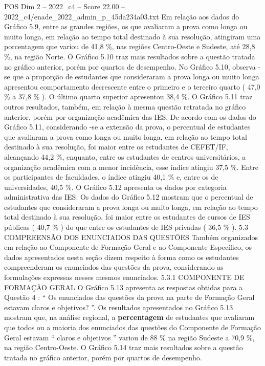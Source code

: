 \begin{textsample}{POS Dim 2 – 2022\_c4 – Score 22.00 – 2022\_c4/enade\_2022\_admin\_p\_45da234a03.txt}
Em relação aos dados do Gráfico 5.9, entre as grandes regiões, os que avaliaram a prova como longa ou muito longa, em relação ao tempo total destinado à sua resolução, atingiram uma porcentagem que variou de 41,8 \%, nas regiões Centro-Oeste e Sudeste, até 28,8 \%, na região Norte.
O Gráfico 5.10 traz mais resultados sobre a questão tratada no gráfico anterior, porém por quartos de desempenho.
No Gráfico 5.10, observa -se que a proporção de estudantes que consideraram a prova longa ou muito longa apresentou comportamento decrescente entre o primeiro e o terceiro quarto ( 47,0 \% a 37,8 \% ).
O último quarto superior apresentou 38,4 \%.
O Gráfico 5.11 traz outros resultados, também, em relação à mesma questão retratada no gráfico anterior, porém por organização acadêmica das IES.
De acordo com os dados do Gráfico 5.11, considerando -se a extensão da prova, o percentual de estudantes que avaliaram a prova como longa ou muito longa, em relação ao tempo total destinado à sua resolução, foi maior entre os estudantes de CEFET/IF, alcançando 44,2 \%, enquanto, entre os estudantes de centros universitários, a organização acadêmica com a menor incidência, esse índice atingiu 37,5 \%.
Entre os participantes de faculdades, o índice atingiu 40,1 \% e, entre os de universidades, 40,5 \%.
O Gráfico 5.12 apresenta os dados por categoria administrativa das IES.
Os dados do Gráfico 5.12 mostram que o percentual de estudantes que consideraram a prova longa ou muito longa, em relação ao tempo total destinado à sua resolução, foi maior entre os estudantes de cursos de IES públicas ( 40,7 \% ) do que entre os estudantes de IES privadas ( 36,5 \% ). 5.3 COMPREENSÃO DOS ENUNCIADOS DAS QUESTÕES Também organizados em relação ao Componente de Formação Geral e ao Componente Específico, os dados apresentados nesta seção dizem respeito à forma como os estudantes compreenderam os enunciados das questões da prova, considerando as formulações expressas nesses mesmos enunciados. 5.3.1 COMPONENTE DE FORMAÇÃO GERAL O Gráfico 5.13 apresenta as respostas obtidas para a Questão 4 : “ Os enunciados das questões da prova na parte de Formação Geral estavam claros e objetivos? ”.
Os resultados apresentados no Gráfico 5.13 mostram que, na análise regional, a \textbf{percentagem} de estudantes que avaliaram que todos ou a maioria dos enunciados das questões do Componente de Formação Geral estavam “ claros e objetivos ” variou de 88 \% na região Sudeste a 70,9 \%, na região Centro-Oeste.
O Gráfico 5.14 traz mais resultados sobre a questão tratada no gráfico anterior, porém por quartos de desempenho.

\end{textsample}
